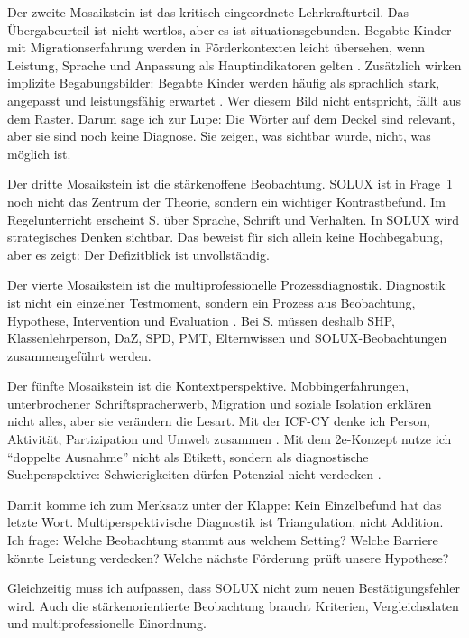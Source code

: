 \documentclass[ngerman, a4paper]{article}
\begin{document}
Der zweite Mosaikstein ist das kritisch eingeordnete Lehrkrafturteil. Das
Übergabeurteil ist nicht wertlos, aber es ist situationsgebunden. Begabte Kinder
mit Migrationserfahrung werden in Förderkontexten leicht übersehen, wenn
Leistung, Sprache und Anpassung als Hauptindikatoren gelten
\parencites{stamm2021fehlenderblick}{koop2025herkunft}{kellerkoller2025hellekoepfe}.
Zusätzlich wirken implizite Begabungsbilder: Begabte Kinder werden häufig als
sprachlich stark, angepasst und leistungsfähig erwartet
\parencite{baudson2021wasdenken}. Wer diesem Bild nicht entspricht, fällt aus
dem Raster. Darum sage ich zur Lupe: Die Wörter auf dem Deckel sind relevant,
aber sie sind noch keine Diagnose. Sie zeigen, was sichtbar wurde, nicht, was
möglich ist.

Der dritte Mosaikstein ist die stärkenoffene Beobachtung. SOLUX ist in Frage~1
noch nicht das Zentrum der Theorie, sondern ein wichtiger Kontrastbefund. Im
Regelunterricht erscheint S. über Sprache, Schrift und Verhalten. In SOLUX wird
strategisches Denken sichtbar. Das beweist für sich allein keine Hochbegabung,
aber es zeigt: Der Defizitblick ist unvollständig.

Der vierte Mosaikstein ist die multiprofessionelle Prozessdiagnostik. Diagnostik
ist nicht ein einzelner Testmoment, sondern ein Prozess aus Beobachtung,
Hypothese, Intervention und Evaluation
\parencites{gauckreimann2021psychdiagnostik}{muelleroppliger2021paeddiagnostik}.
Bei S. müssen deshalb SHP, Klassenlehrperson, DaZ, SPD, PMT, Elternwissen und
SOLUX-Beobachtungen zusammengeführt werden.

Der fünfte Mosaikstein ist die Kontextperspektive. Mobbingerfahrungen,
unterbrochener Schriftspracherwerb, Migration und soziale Isolation erklären
nicht alles, aber sie verändern die Lesart. Mit der ICF-CY denke ich Person,
Aktivität, Partizipation und Umwelt zusammen \parencite{who2007icfcy}. Mit dem
2e-Konzept nutze ich \enquote{doppelte Ausnahme} nicht als Etikett, sondern als
diagnostische Suchperspektive: Schwierigkeiten dürfen Potenzial nicht verdecken
\parencites{kappus2010migration}{baumschader2021twice}{webb2020doppeldiagnosen}.

Damit komme ich zum Merksatz unter der Klappe: Kein Einzelbefund hat das letzte
Wort. Multiperspektivische Diagnostik ist Triangulation, nicht Addition. Ich
frage: Welche Beobachtung stammt aus welchem Setting? Welche Barriere könnte
Leistung verdecken? Welche nächste Förderung prüft unsere Hypothese?

Gleichzeitig muss ich aufpassen, dass SOLUX nicht zum neuen Bestätigungsfehler
wird. Auch die stärkenorientierte Beobachtung braucht Kriterien,
Vergleichsdaten und multiprofessionelle Einordnung.
\end{document}
